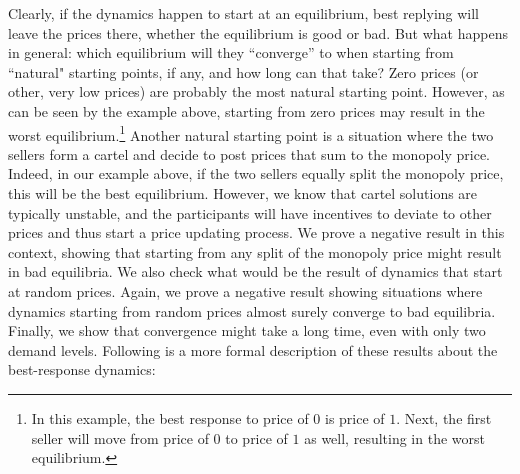 Clearly, if the dynamics happen to start at an equilibrium, best replying will leave the prices there,
whether the equilibrium is good or bad.
But what happens in general:
which equilibrium will they ``converge'' to when starting from ``natural" starting points, if any,
and how long can that take?
Zero  prices (or other, very low prices) are probably the most natural starting point.
However, as can be seen by the example above, starting from zero prices may result in the worst equilibrium.\footnote{In this example, the best response to price of $0$ is price of $1$. Next, the first seller will move from price of $0$ to price of $1$ as well, resulting in the worst equilibrium.}
Another natural starting point is a situation where the two sellers form a cartel and decide to post prices that sum to the monopoly price.
Indeed, in our example above, if the two sellers equally split the monopoly price, this will be the best equilibrium.
However, we know that cartel solutions are typically unstable, and the participants will have incentives to deviate to other prices and thus start a price updating process. We prove a negative result in this context, showing that starting from any split of the monopoly price might result in bad equilibria.
We also check what would be the result of dynamics that start at random prices. Again, we prove a negative result showing situations where dynamics starting from random prices almost surely converge to bad equilibria.
Finally, we show that convergence might take a long time, even with only two demand levels. Following is a more formal description of these results about the best-response dynamics:
%


